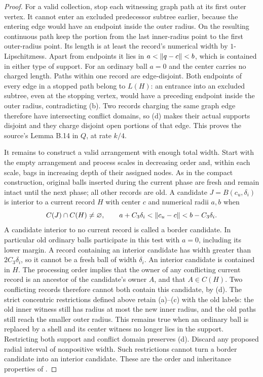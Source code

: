 \begin{proof}
For a valid collection, stop each witnessing graph path at its
first outer vertex.  It cannot enter an excluded predecessor
subtree earlier, because the entering edge would have an endpoint
inside the outer radius.  On the resulting continuous path keep
the portion from the last inner-radius point to the first
outer-radius point.  Its length is at least the record's numerical
width by $1$-Lipschitzness.  Apart from endpoints it lies in
$a<\lVert q-c\rVert<b$, which is contained in either type of support.
For an ordinary ball $a=0$ and the center carries no charged length.
Paths within one record are edge-disjoint.
Both endpoints of every edge in a stopped path belong to $L(H)$:
an entrance into an excluded subtree, even at the stopping vertex,
would have a preceding endpoint inside the outer radius, contradicting
(b).  Two records charging the same graph edge therefore have intersecting
conflict domains, so (d) makes their actual supports disjoint and
they charge disjoint open portions of that edge.  This proves
the source's Lemma B.14 in $Q$, at rate $k/4$.

It remains to construct a valid arrangement with enough total width.
Start with the empty arrangement and process scales in decreasing
order and, within each scale, bags in
increasing depth of their assigned nodes.  As in the compact
construction, original balls inserted during the current phase are
fresh and remain intact until the next phase; all other records are
old.  A candidate
$J=B(c_u,\delta_i)$ is interior to a current record
$H$ with center $c$ and numerical radii $a,b$ when
\[
 C(J)\cap C(H)\ne\varnothing,
 \qquad a+C_3\delta_i<\lVert c_u-c\rVert<b-C_3\delta_i.
\]
A candidate interior to no current record is called a border
candidate.  In particular old ordinary balls participate in this
test with $a=0$, including its lower margin.  A record containing an
interior candidate has width greater than $2C_3\delta_i$, so it
cannot be a fresh ball of width $\delta_i$.  An interior candidate is
contained in $H$.  The processing order implies that the owner of
any conflicting current record is an ancestor of the candidate's
owner $A$, and that $A\in C(H)$.  Two conflicting records therefore
cannot both contain this candidate, by (d).  The strict concentric
restrictions defined above retain (a)--(c) with the old labels:
the old inner witness still has radius at most the new inner
radius, and the old paths still reach the smaller outer radius.
This remains true when an ordinary ball is replaced by a shell
and its center witness no longer lies in the support.
Restricting both support and conflict domain
preserves (d).  Discard any proposed radial interval of nonpositive
width.  Such restrictions cannot turn a border candidate
into an interior candidate.  These are the order and inheritance
properties of \cite[Lemmas B.17--B.20]{ThinTreesCompanion}.


\end{proof}
